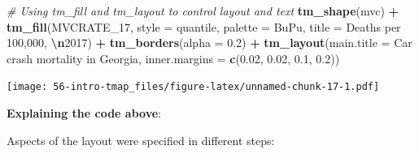 \documentclass[
]{book}
\newenvironment{Shaded}{\begin{snugshade}}{\end{snugshade}}
\newcommand{\AttributeTok}[1]{\textcolor[rgb]{0.13,0.29,0.53}{#1}}
\newcommand{\CommentTok}[1]{\textcolor[rgb]{0.56,0.35,0.01}{\textit{#1}}}
\newcommand{\FloatTok}[1]{\textcolor[rgb]{0.00,0.00,0.81}{#1}}
\newcommand{\FunctionTok}[1]{\textcolor[rgb]{0.13,0.29,0.53}{\textbf{#1}}}
\newcommand{\NormalTok}[1]{#1}
\newcommand{\SpecialCharTok}[1]{\textcolor[rgb]{0.81,0.36,0.00}{\textbf{#1}}}
\newcommand{\StringTok}[1]{\textcolor[rgb]{0.31,0.60,0.02}{#1}}
\begin{document}
\begin{Shaded}
\begin{Highlighting}[]
\CommentTok{\# Using tm\_fill and tm\_layout to control layout and text}
\FunctionTok{tm\_shape}\NormalTok{(mvc) }\SpecialCharTok{+}
  \FunctionTok{tm\_fill}\NormalTok{(}\StringTok{\textquotesingle{}MVCRATE\_17\textquotesingle{}}\NormalTok{,}
          \AttributeTok{style =} \StringTok{\textquotesingle{}quantile\textquotesingle{}}\NormalTok{,}
          \AttributeTok{palette =} \StringTok{\textquotesingle{}BuPu\textquotesingle{}}\NormalTok{,}
          \AttributeTok{title =} \StringTok{\textquotesingle{}Deaths per 100,000, }\SpecialCharTok{\textbackslash{}n}\StringTok{2017\textquotesingle{}}\NormalTok{) }\SpecialCharTok{+}
  \FunctionTok{tm\_borders}\NormalTok{(}\AttributeTok{alpha =} \FloatTok{0.2}\NormalTok{) }\SpecialCharTok{+}
  \FunctionTok{tm\_layout}\NormalTok{(}\AttributeTok{main.title =} \StringTok{\textquotesingle{}Car crash mortality in Georgia\textquotesingle{}}\NormalTok{,}
            \AttributeTok{inner.margins =} \FunctionTok{c}\NormalTok{(}\FloatTok{0.02}\NormalTok{, }\FloatTok{0.02}\NormalTok{, }\FloatTok{0.1}\NormalTok{, }\FloatTok{0.2}\NormalTok{))}
\end{Highlighting}
\end{Shaded}

\texttt{[image: 56-intro-tmap\_files/figure-latex/unnamed-chunk-17-1.pdf]}

\textbf{Explaining the code above}:

Aspects of the layout were specified in different steps:
\end{document}
